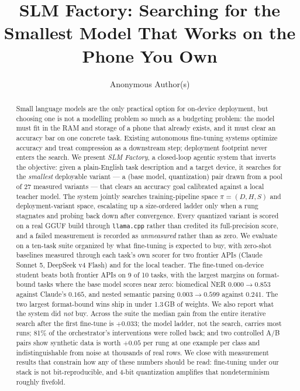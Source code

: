 \documentclass[sigconf,10pt]{acmart}
\newcommand{\TODO}[1]{\textcolor{red}{\textbf{[TODO: #1]}}}
\begin{document}
\title{\huge{SLM Factory: Searching for the Smallest Model That Works on the Phone You Own}}

\renewcommand{\shorttitle}{SLM Factory: Footprint-Constrained Closed-Loop Fine-Tuning}

\author{Anonymous Author(s)}

\begin{abstract}
Small language models are the only practical option for on-device deployment, but
choosing one is not a modelling problem so much as a budgeting problem: the model
must fit in the RAM and storage of a phone that already exists, and it must clear an
accuracy bar on one concrete task. Existing autonomous fine-tuning systems optimize
accuracy and treat compression as a downstream step; deployment footprint never enters
the search. We present \emph{SLM Factory}, a closed-loop agentic system that inverts the
objective: given a plain-English task description and a target device, it searches for
the \emph{smallest} deployable variant --- a (base model, quantization) pair drawn from a
pool of 27 measured variants --- that clears an accuracy goal calibrated against a local
teacher model. The system jointly searches training-pipeline space $\pi=(D,H,S)$ and
deployment-variant space, escalating up a size-ordered ladder only when a rung stagnates
and probing back down after convergence. Every quantized variant is scored on a real
GGUF build through \texttt{llama.cpp} rather than credited its full-precision score, and
a failed measurement is recorded as \emph{unmeasured} rather than as zero.
We evaluate on a ten-task suite organized by what fine-tuning is expected to buy, with
zero-shot baselines measured through each task's own scorer for two frontier APIs
(Claude Sonnet 5, DeepSeek v4 Flash) and for the local teacher. The fine-tuned on-device
student beats both frontier APIs on 9 of 10 tasks, with the largest margins on
format-bound tasks where the base model scores near zero: biomedical NER $0.000\to0.853$
against Claude's $0.165$, and nested semantic parsing $0.003\to0.599$ against $0.241$.
The two largest format-bound wins ship in under 1.3\,GB of weights.
We also report what the system did \emph{not} buy. Across the suite the median gain from
the entire iterative search after the first fine-tune is $+0.033$; the model ladder, not
the search, carries most runs; 81\% of the orchestrator's interventions were rolled back;
and two controlled A/B pairs show synthetic data is worth $+0.05$ per rung at one example
per class and indistinguishable from noise at thousands of real rows. We close with
measurement results that constrain how any of these numbers should be read: fine-tuning
under our stack is not bit-reproducible, and 4-bit quantization amplifies that
nondeterminism roughly fivefold.
\end{abstract}
\end{document}
